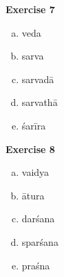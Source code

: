 \begin{multicols}{2}
\textbf{Exercise 7}
\begin{enumerate}[a.]
\item veda 
\item sarva  
\item sarvadā 
\item sarvathā 
\item śarīra
\end{enumerate}

\textbf{Exercise 8}
\begin{enumerate}[a.]
\item vaidya 
\item ātura 
\item darśana 
\item sparśana 
\item praśna
\end{enumerate}
\end{multicols}

